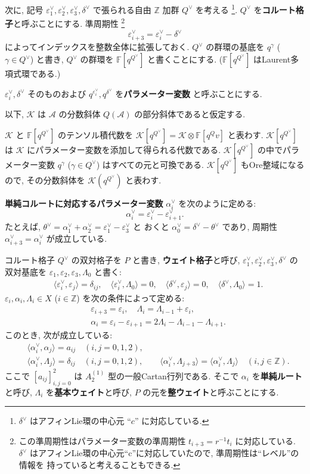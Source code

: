 \documentclass[12pt,twoside,dvipdfm]{msjproc}
\newcommand\Z{{\mathbb Z}} %
\newcommand\F{{\mathbb F}} %
\theoremstyle{definition} %
\theoremstyle{definition} %
\theoremstyle{definition} %
\numberwithin{theorem}{section}
\numberwithin{equation}{section}
\numberwithin{figure}{section}
\numberwithin{table}{section}
\newcommand\bra{\langle}
\newcommand\ket{\rangle}
\newcommand\eps{\varepsilon}
\newcommand\A{\mathcal{A}}
\newcommand\K{\mathcal{K}}
\newcommand\ev{\varepsilon^\vee}
\newcommand\av{\alpha^\vee}
\newcommand\dv{\delta^\vee}
\newcommand\Qv{{Q^\vee}}
\begin{document}
次に, 記号 $\ev_1,\ev_2,\ev_3,\dv$ で張られる自由 $\Z$ 加群 $\Qv$ を考える%
\footnote{$\dv$ はアフィンLie環の中心元 ``$c$'' に対応している.}.
$\Qv$ を{\bf コルート格子}と呼ぶことにする.
準周期性%
\footnote{この準周期性はパラメーター変数の準周期性 $t_{i+3}=r^{-1}t_i$ に対応している.
$\dv$ はアフィンLie環の中心元``c''に対応していたので, 準周期性は``レベル''の情報を
持っていると考えることもできる.}
\begin{equation*}
  \ev_{i+3} = \ev_i - \dv
\end{equation*}
によってインデックスを整数全体に拡張しておく.
$\Qv$ の群環の基底を $q^\gamma$ ($\gamma\in\Qv$) と書き, 
$\Qv$ の群環を $\F[q^\Qv]$ と書くことにする.
($\F[q^\Qv]$ はLaurent多項式環である.)

$\ev_i,\dv$ そのものおよび $q^{\ev_i},q^{\dv}$ を{\bf パラメーター変数}
と呼ぶことにする.

以下, $\K$ は $\A$ の分数斜体 $Q(\A)$ の部分斜体であると仮定する.

$\K$ と $\F[q^\Qv]$ のテンソル積代数を $\K[q^\Qv]=\K\otimes\F[q^Qv]$ と表わす.
$\K[q^\Qv]$ は $\K$ にパラメーター変数を添加して得られる代数である.
$\K[q^\Qv]$ の中でパラメーター変数 $q^\gamma$ ($\gamma\in\Qv$) はすべての元と可換である.
$\K[q^\Qv]$ もOre整域になるので, その分数斜体を $\K(q^\Qv)$ と表わす.

{\bf 単純コルートに対応するパラメーター変数} $\av_i$ を次のように定める:
\begin{equation*}
 \av_i = \ev_i-\ev_{i+1}.
\end{equation*}
たとえば, $\theta^\vee=\av_1+\av_2=\ev_1-\ev_3$ と
おくと $\av_0=\dv-\theta^\vee$ であり, 
周期性 $\av_{i+3}=\av_i$ が成立している.


コルート格子 $\Qv$ の双対格子を $P$ と書き, {\bf ウェイト格子}と呼び,  
$\ev_1,\ev_2,\ev_3,\dv$ の双対基底を $\eps_1,\eps_2,\eps_3,\Lambda_0$ と書く:
\begin{align*}
 &
 \bra\ev_i,\eps_j\ket=\delta_{ij}, \quad
 \bra\ev_i,\Lambda_0\ket=0, \quad
 \bra\dv,\eps_j\ket=0, \quad
 \bra\dv,\Lambda_0\ket=1.
\end{align*}
$\eps_i,\alpha_i, \Lambda_i\in X$ ($i\in\Z$) を次の条件によって定める:
\begin{align*}
 &
 \eps_{i+3}=\eps_i, \quad
 \Lambda_i = \Lambda_{i-1} + \eps_i,
 \\ &
 \alpha_i = \eps_i - \eps_{i+1} = 2\Lambda_i-\Lambda_{i-1}-\Lambda_{i+1}.
\end{align*}
このとき, 次が成立している:
\begin{align*}
 &
 \bra\av_i,\alpha_j\ket = a_{ij} \quad (i,j=0,1,2),
 \\ &
 \bra\av_i,\Lambda_j\ket = \delta_{ij} \quad (i,j=0,1,2),
 \qquad
 \bra\av_i,\Lambda_{j+3}\ket=\bra\av_i,\Lambda_j\ket \quad (i,j\in\Z).
\end{align*}
ここで $[a_{ij}]_{i,j=0}^2$ は $A^{(1)}_2$ 型の一般Cartan行列である.
そこで $\alpha_i$ を{\bf 単純ルート}と呼び, 
$\Lambda_i$ を{\bf 基本ウェイト}と呼び, 
$P$ の元を{\bf 整ウェイト}と呼ぶことにする.
\end{document}
